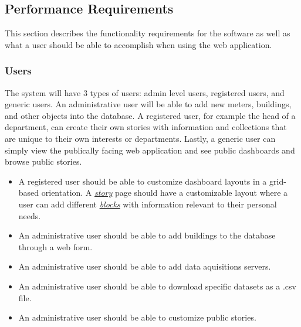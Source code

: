 \documentclass[onecolumn, draftclsnofoot,10pt, compsoc]{IEEEtran}
\begin{document}
    \subsection{Performance Requirements}
    This section describes the functionality requirements for the software as well as what a user should be able to accomplish when using the web application.

    \subsubsection{Users}
    The system will have 3 types of users: admin level users, registered users, and generic users. An administrative user will be able to add new meters, buildings, and other objects into the database. A registered user, for example the head of a department, can create their own stories with information and collections that are unique to their own interests or departments. Lastly, a generic user can simply view the publically facing web application and see public dashboards and browse public stories. 
    \begin{itemize}
        \item A registered user should be able to customize dashboard layouts in a grid-based orientation. A \hyperref[definition]{\textit{story}} page should have a customizable layout where a user can add different \hyperref[definition]{\textit{blocks}} with information relevant to their personal needs.
        \item An administrative user should be able to add buildings to the database through a web form.
        \item An administrative user should be able to add data aquisitions servers.
        \item An administrative user should be able to download specific datasets as a .csv file.
        \item An administrative user should be able to customize public stories.
    \end{itemize}
\end{document}
